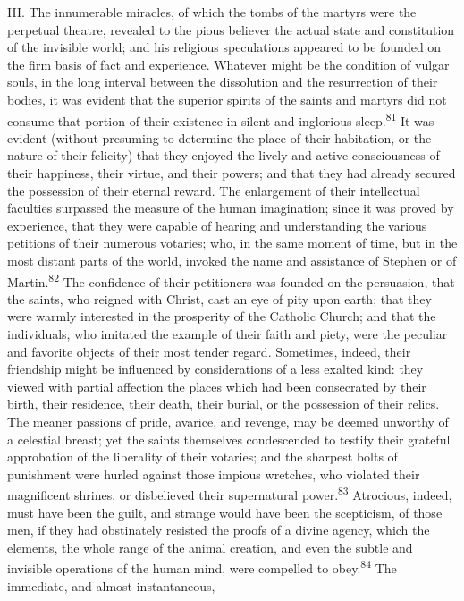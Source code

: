 III. The innumerable miracles, of which the tombs of the martyrs
were the perpetual theatre, revealed to the pious believer the
actual state and constitution of the invisible world; and his
religious speculations appeared to be founded on the firm basis
of fact and experience. Whatever might be the condition of vulgar
souls, in the long interval between the dissolution and the
resurrection of their bodies, it was evident that the superior
spirits of the saints and martyrs did not consume that portion of
their existence in silent and inglorious sleep.\textsuperscript{81} It was evident
(without presuming to determine the place of their habitation, or
the nature of their felicity) that they enjoyed the lively and
active consciousness of their happiness, their virtue, and their
powers; and that they had already secured the possession of their
eternal reward. The enlargement of their intellectual faculties
surpassed the measure of the human imagination; since it was
proved by experience, that they were capable of hearing and
understanding the various petitions of their numerous votaries;
who, in the same moment of time, but in the most distant parts of
the world, invoked the name and assistance of Stephen or of
Martin.\textsuperscript{82} The confidence of their petitioners was founded on the
persuasion, that the saints, who reigned with Christ, cast an eye
of pity upon earth; that they were warmly interested in the
prosperity of the Catholic Church; and that the individuals, who
imitated the example of their faith and piety, were the peculiar
and favorite objects of their most tender regard. Sometimes,
indeed, their friendship might be influenced by considerations of
a less exalted kind: they viewed with partial affection the
places which had been consecrated by their birth, their
residence, their death, their burial, or the possession of their
relics. The meaner passions of pride, avarice, and revenge, may
be deemed unworthy of a celestial breast; yet the saints
themselves condescended to testify their grateful approbation of
the liberality of their votaries; and the sharpest bolts of
punishment were hurled against those impious wretches, who
violated their magnificent shrines, or disbelieved their
supernatural power.\textsuperscript{83} Atrocious, indeed, must have been the
guilt, and strange would have been the scepticism, of those men,
if they had obstinately resisted the proofs of a divine agency,
which the elements, the whole range of the animal creation, and
even the subtle and invisible operations of the human mind, were
compelled to obey.\textsuperscript{84} The immediate, and almost instantaneous,
